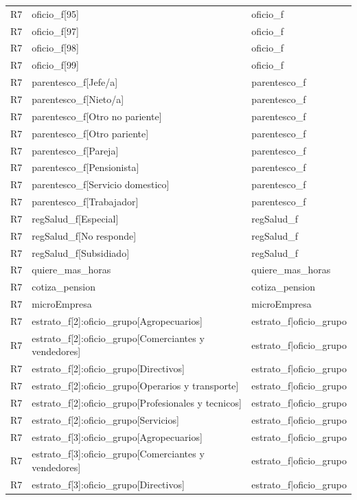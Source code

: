 \begin{longtable}{lll}
R7 & oficio\_f[95] & oficio\_f \\
R7 & oficio\_f[97] & oficio\_f \\
R7 & oficio\_f[98] & oficio\_f \\
R7 & oficio\_f[99] & oficio\_f \\
R7 & parentesco\_f[Jefe/a] & parentesco\_f \\
R7 & parentesco\_f[Nieto/a] & parentesco\_f \\
R7 & parentesco\_f[Otro no pariente] & parentesco\_f \\
R7 & parentesco\_f[Otro pariente] & parentesco\_f \\
R7 & parentesco\_f[Pareja] & parentesco\_f \\
R7 & parentesco\_f[Pensionista] & parentesco\_f \\
R7 & parentesco\_f[Servicio domestico] & parentesco\_f \\
R7 & parentesco\_f[Trabajador] & parentesco\_f \\
R7 & regSalud\_f[Especial] & regSalud\_f \\
R7 & regSalud\_f[No responde] & regSalud\_f \\
R7 & regSalud\_f[Subsidiado] & regSalud\_f \\
R7 & quiere\_mas\_horas & quiere\_mas\_horas \\
R7 & cotiza\_pension & cotiza\_pension \\
R7 & microEmpresa & microEmpresa \\
R7 & estrato\_f[2]:oficio\_grupo[Agropecuarios] & estrato\_f|oficio\_grupo \\
R7 & estrato\_f[2]:oficio\_grupo[Comerciantes y vendedores] & estrato\_f|oficio\_grupo \\
R7 & estrato\_f[2]:oficio\_grupo[Directivos] & estrato\_f|oficio\_grupo \\
R7 & estrato\_f[2]:oficio\_grupo[Operarios y transporte] & estrato\_f|oficio\_grupo \\
R7 & estrato\_f[2]:oficio\_grupo[Profesionales y tecnicos] & estrato\_f|oficio\_grupo \\
R7 & estrato\_f[2]:oficio\_grupo[Servicios] & estrato\_f|oficio\_grupo \\
R7 & estrato\_f[3]:oficio\_grupo[Agropecuarios] & estrato\_f|oficio\_grupo \\
R7 & estrato\_f[3]:oficio\_grupo[Comerciantes y vendedores] & estrato\_f|oficio\_grupo \\
R7 & estrato\_f[3]:oficio\_grupo[Directivos] & estrato\_f|oficio\_grupo \\

\end{longtable}
